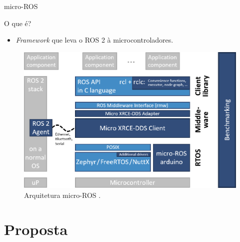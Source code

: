 \documentclass{if-beamer}
\begin{document}
\begin{frame}{micro-ROS}
	
	\begin{block}{O que é?}
		\begin{itemize}
			\item \textit{Framework} que leva o ROS 2 à microcontroladores.
		\end{itemize}
	\end{block}
	
	\begin{figure}
		\centering
		\includegraphics[width=0.7\linewidth]{img/micro-ROS_architecture}
		\caption{Arquitetura micro-ROS \cite{microros}.}
		\label{fig:micro-rosarchitecture}
	\end{figure}
	
	
	
\end{frame}

\section{Proposta}
\end{document}
